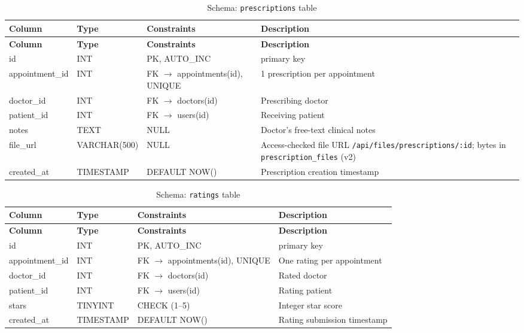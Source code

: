 \begin{longtable}{|L{2.8cm}|L{2.6cm}|L{2.2cm}|L{5.2cm}|}
\caption{Schema: \texttt{prescriptions} table} \label{tab:pres} \\
\hline
\textbf{Column} & \textbf{Type} & \textbf{Constraints} & \textbf{Description} \\
\hline
\endfirsthead
\hline
\textbf{Column} & \textbf{Type} & \textbf{Constraints} & \textbf{Description} \\
\hline
\endhead
\hline
\endfoot
id              & INT           & PK, AUTO\_INC    &  primary key \\
\hline
appointment\_id & INT           & FK $\rightarrow$ appointments(id), UNIQUE & 1 prescription per appointment \\
\hline
doctor\_id      & INT           & FK $\rightarrow$ doctors(id) & Prescribing doctor \\
\hline
patient\_id     & INT           & FK $\rightarrow$ users(id)   & Receiving patient \\
\hline
notes           & TEXT          & NULL             & Doctor's free-text clinical notes \\
\hline
file\_url       & VARCHAR(500)  & NULL             & Access-checked file URL \texttt{/api/\allowbreak files/\allowbreak prescriptions/:id}; bytes in \texttt{prescription\_files} (v2) \\
\hline
created\_at     & TIMESTAMP     & DEFAULT NOW()    & Prescription creation timestamp \\
\hline
\end{longtable}

\begin{longtable}{|L{2.8cm}|L{2.6cm}|L{2.2cm}|L{5.2cm}|}
\caption{Schema: \texttt{ratings} table} \label{tab:ratings} \\
\hline
\textbf{Column} & \textbf{Type} & \textbf{Constraints} & \textbf{Description} \\
\hline
\endfirsthead
\hline
\textbf{Column} & \textbf{Type} & \textbf{Constraints} & \textbf{Description} \\
\hline
\endhead
\hline
\endfoot
id              & INT          & PK, AUTO\_INC   &  primary key \\
\hline
appointment\_id & INT          & FK $\rightarrow$ appointments(id), UNIQUE & One rating per appointment \\
\hline
doctor\_id      & INT          & FK $\rightarrow$ doctors(id) & Rated doctor \\
\hline
patient\_id     & INT          & FK $\rightarrow$ users(id)   & Rating patient \\
\hline
stars           & TINYINT      & CHECK (1--5)     & Integer star score \\
\hline
created\_at     & TIMESTAMP    & DEFAULT NOW()    & Rating submission timestamp \\
\hline
\end{longtable}

